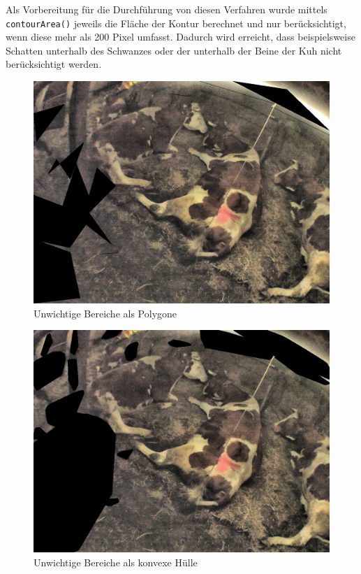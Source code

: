Als Vorbereitung für die Durchführung von diesen Verfahren wurde mittels \texttt{contourArea()} jeweils die Fläche der Kontur berechnet und nur berücksichtigt, wenn diese mehr als 200 Pixel umfasst. Dadurch wird erreicht, dass beispielsweise Schatten unterhalb des Schwanzes oder der unterhalb der Beine der Kuh nicht berücksichtigt werden.
\begin{figure}[H]
	\center
	\includegraphics[scale=0.43]{Grafiken/entwicklung/7unwichtigePolygone.jpg}
	\caption{Unwichtige Bereiche als Polygone } 
	\label{fig: Unwichtige Bereiche als Polygone}
\end{figure}


\begin{figure}[H]
	\center
	\includegraphics[scale=0.43]{Grafiken/entwicklung/7unwichtigeKonvexe.jpg}
	\caption{Unwichtige Bereiche als konvexe Hülle} 
	\label{fig: Unwichtige Bereiche als konvexe Hülle}
\end{figure}


